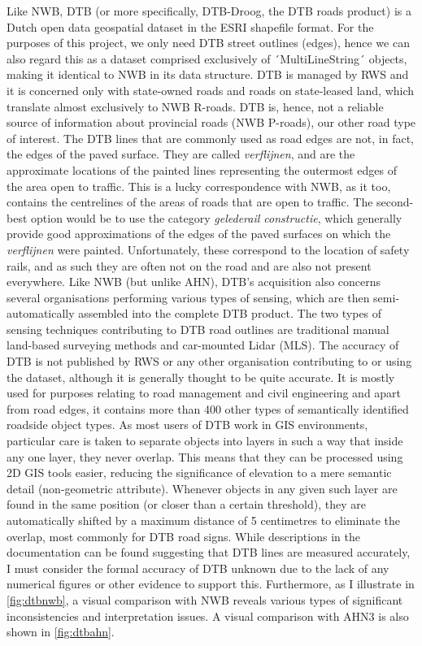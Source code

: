 Like NWB, DTB (or more specifically, DTB-Droog, the DTB roads product) is a Dutch open data geospatial dataset in the ESRI shapefile format. For the purposes of this project, we only need DTB street outlines (edges), hence we can also regard this as a dataset comprised exclusively of ´MultiLineString´ objects, making it identical to NWB in its data structure. DTB is managed by RWS and it is concerned only with state-owned roads and roads on state-leased land, which translate almost exclusively to NWB R-roads. DTB is, hence, not a reliable source of information about provincial roads (NWB P-roads), our other road type of interest. The DTB lines that are commonly used as road edges are not, in fact, the edges of the paved surface. They are called \textit{verflijnen}, and are the approximate locations of the painted lines representing the outermost edges of the area open to traffic. This is a lucky correspondence with NWB, as it too, contains the centrelines of the areas of roads that are open to traffic. The second-best option would be to use the category \textit{gelederail constructie}, which generally provide good approximations of the edges of the paved surfaces on which the \textit{verflijnen} were painted. Unfortunately, these correspond to the location of safety rails, and as such they are often not on the road and are also not present everywhere. Like NWB (but unlike AHN), DTB’s acquisition also concerns several organisations performing various types of sensing, which are then semi-automatically assembled into the complete DTB product. The two types of sensing techniques contributing to DTB road outlines are traditional manual land-based surveying methods and car-mounted Lidar (MLS). The accuracy of DTB is not published by RWS or any other organisation contributing to or using the dataset, although it is generally thought to be quite accurate. It is mostly used for purposes relating to road management and civil engineering and apart from road edges, it contains more than 400 other types of semantically identified roadside object types. As most users of DTB work in GIS environments, particular care is taken to separate objects into layers in such a way that inside any one layer, they never overlap. This means that they can be processed using 2D GIS tools easier, reducing the significance of elevation to a mere semantic detail (non-geometric attribute). Whenever objects in any given such layer are found in the same position (or closer than a certain threshold), they are automatically shifted by a maximum distance of 5 centimetres to eliminate the overlap, most commonly for DTB road signs. While descriptions in the documentation can be found suggesting that DTB lines are measured accurately, I must consider the formal accuracy of DTB unknown due to the lack of any numerical figures or other evidence to support this. Furthermore, as I illustrate in \ref{fig:dtbnwb}, a visual comparison with NWB reveals various types of significant inconsistencies and interpretation issues. A visual comparison with AHN3 is also shown in \ref{fig:dtbahn}.

